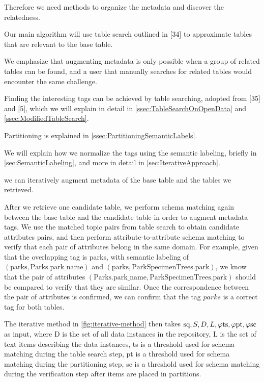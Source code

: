 Therefore we need methods to organize the metadata and discover the relatedness.

Our main algorithm will use table search outlined in \cite{Mudgal2018Deep}[34] to approximate tables that are relevant to the base table.

We emphasize that augmenting metadata is only possible when a group of related tables can be found, and a user that manually searches for related tables would encounter the same challenge.

Finding the interesting tags can be achieved by table searching, adopted from \cite{Nargesian2018Table}[35] and \cite{conf/esws/EllefiBDT16}[5], which we will explain in detail in \autoref{ssec:TableSearchOnOpenData} and \autoref{ssec:ModifiedTableSearch}.

Partitioning is explained in \autoref{ssec:PartitioningSemanticLabels}.

We will explain how we normalize the tags using the semantic labeling, briefly in \autoref{sec:SemanticLabeling}, and more in detail in \autoref{sec:IterativeApproach}.

we can iteratively augment metadata of the base table and the tables we retrieved.

After we retrieve one candidate table, we perform schema matching again between the base table and the candidate table in order to augment metadata tags. We use the matched topic pairs from table search to obtain candidate attributes pairs, and then perform attribute-to-attribute schema matching to verify that each pair of attributes belong in the same domain. For example, given that the overlapping tag is parks, with semantic labeling of $(\text{parks},\text{Parks.park\_name})$ and $(\text{parks},\text{ParkSpecimenTrees.park})$, we know that the pair of attributes $(\text{Parks.park\_name},\text{ParkSpecimenTrees.park})$ should be compared to verify that they are similar. Once the correspondence between the pair of attributes is confirmed, we can confirm that the tag $parks$ is a correct tag for both tables.

The iterative method in \autoref{fig:iterative-method} then takes $\text{sq},S,D,L,\text{\ensuremath{\varphi}ts},\text{\ensuremath{\varphi}pt},\text{\ensuremath{\varphi}sc}$ as input, where D is the set of all data instances in the repository, L is the set of text items describing the data instances, ts is a threshold used for schema matching during the table search step, pt is a threshold used for schema matching during the partitioning step, sc is a threshold used for schema matching during the verification step after items are placed in partitions.


